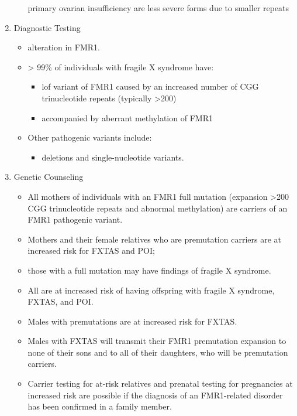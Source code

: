 \documentclass{scrartcl}
\begin{document}
\begin{enumerate}
\begin{itemize}
primary ovarian insufficiency are less severe forms due to smaller
repeats
\end{itemize}
\item Diagnostic Testing
\label{sec:org63f5ad9}
\begin{itemize}
\item alteration in FMR1.
\item \textgreater{} 99\% of individuals with fragile X syndrome have:
\begin{itemize}
\item lof variant of FMR1 caused by an increased number of CGG
trinucleotide repeats (typically >200)
\item accompanied by aberrant methylation of FMR1
\end{itemize}
\item Other pathogenic variants include:
\begin{itemize}
\item deletions and single-nucleotide variants.
\end{itemize}
\end{itemize}
\item Genetic Counseling
\label{sec:org6841b45}
\begin{itemize}
\item All mothers of individuals with an FMR1 full mutation (expansion
>200 CGG trinucleotide repeats and abnormal methylation) are
carriers of an FMR1 pathogenic variant.
\item Mothers and their female relatives who are premutation carriers are
at increased risk for FXTAS and POI;
\item those with a full mutation may have findings of fragile X syndrome.
\item All are at increased risk of having offspring with fragile X syndrome, FXTAS, and POI.
\item Males with premutations are at increased risk for FXTAS.
\item Males with FXTAS will transmit their FMR1 premutation expansion to none of their sons and to all of their daughters, who will be premutation carriers.
\item Carrier testing for at-risk relatives and prenatal testing for
pregnancies at increased risk are possible if the diagnosis of an
FMR1-related disorder has been confirmed in a family member.
\end{itemize}
\end{enumerate}
\end{document}
